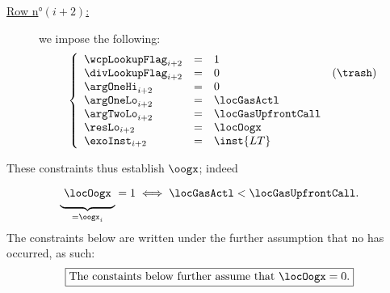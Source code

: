 \begin{description}
\[		\]
	\item[\underline{Row n$°(i + 2)$:}] we impose the following:
		\[
			\left\{ \begin{array}{lclc}
				\wcpLookupFlag_{i + 2} & = & 1 \\
				\divLookupFlag_{i + 2} & = & 0 & (\trash) \\
				\argOneHi_{i + 2}      & = & 0 \\
				\argOneLo_{i + 2}      & = & \locGasActl \\
				\argTwoLo_{i + 2}      & = & \locGasUpfrontCall \\
				\resLo_{i + 2}         & = & \locOogx \\
				\exoInst_{i + 2}       & = & \inst{LT} \\
			\end{array} \right.
		\]
\end{description}
These constraints thus establish $\oogx$; indeed
\[
	\underbrace{\phantom{\Big|}\locOogx\phantom{\Big|}}_{= \oogx_{i}} = 1 \iff \locGasActl < \locGasUpfrontCall.
\]
The constraints below are written under the further assumption that no \oogxSH{} has occurred, as such: 
\[
	\boxed{\text{The constaints below further assume that } \locOogx = 0.}
\]

